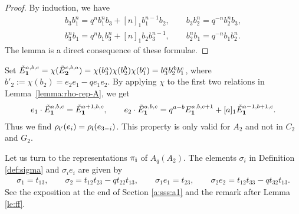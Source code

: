 \documentclass[11pt]{article}
\begin{document}
\begin{proof}
By induction, we have
\begin{gather*}
{b_3 b_1^n} = q^n {b_1^n b_3}+[n]_1 {b_1^{n-1} b_2},  \qquad
{b_3 b_2^n} = q^{-n} {b_2^n b_3},\\
{b_3^n b_1} = q^n {b_1 b_3^n}+[n]_1 {b_2 b_3^{n-1}},  \qquad
{b_2^n b_1} = q^{-n} {b_1 b_2^n}.
\end{gather*}
The lemma is a direct consequence of these formulae.
\end{proof}

Set
${\tilde E}^{a,b,c}_{\bf 1} = \chi({\tilde E}^{c,b,a}_{\bf 2})
= \chi(b^a_3)\chi(b^b_2)\chi(b^c_1)
=b_3^ab_2^{\prime b}b_1^c$,
where $b'_2 := \chi(b_2) = e_2e_1-qe_1e_2$.
By applying $\chi$ to the f\/irst two relations
in Lemma~\ref{lemma:rho-rep-A}, we get
\begin{gather}\label{a:kore}
e_1\cdot {\tilde E}^{a,b,c}_{\bf 1} = {\tilde E}^{a+1,b,c}_{\bf 1},
\qquad
e_2\cdot {\tilde E}^{a,b,c}_{\bf 1} = q^{a-b}E^{a,b,c+1}_{\bf 1}
+[a]_1{\tilde E}^{a-1,b+1,c}_{\bf 1}.
\end{gather}
Thus we f\/ind $\rho_{{\bf i}'}(e_i) = \rho_{\bf i}(e_{3-i})$.
This property is only valid for $A_2$ and not in $C_2$ and $G_2$.

Let us turn to the representations $\pi_{{\bf i}}$ of $A_q(A_2)$.
The elements $\sigma_i$ in Def\/inition \ref{def:sigma}
and $\sigma_ie_i$
are given by{\samepage
\begin{gather}\label{a:kobetsu}
\sigma_1 = t_{13}, \qquad
\sigma_2 = t_{12}t_{23}-qt_{22}t_{13},\qquad
\sigma_1 e_1 = t_{23},\qquad
\sigma_2e_2 = t_{12}t_{33}-qt_{32}t_{13}.
\end{gather}
See the exposition at the end of Section \ref{a:sss:a1} and the remark after
Lemma \ref{le:ff}.}
\end{document}
